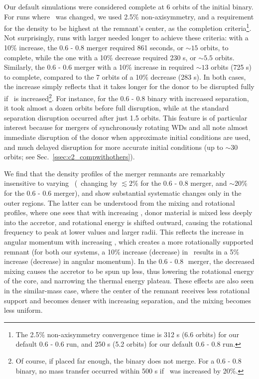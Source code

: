 Our default simulations were considered complete at 6 orbits of the initial binary.  For runs where \azero\ was changed, we used 2.5\% non-axisymmetry, and a requirement for the density to be highest at the remnant's center, as the completion criteria\footnote{The 2.5\% non-axisymmetry convergence time is 312 s (6.6 orbits) for our default 0.6 - 0.6 {\Msun} run, and 250 s (5.2 orbits) for our default 0.6 - 0.8 {\Msun} run.}.  Not surprisingly, runs with larger {\azero} needed longer to achieve these criteria: with a 10\% increase, the 0.6 - 0.8 {\Msun} merger required 861 seconds, or $\sim\!15$ orbits, to complete, while the one with a 10\% decrease required 230 s, or $\sim\!5.5$ orbits.  Similarly, the 0.6 - 0.6 {\Msun} merger with a 10\% increase in {\azero} required $\sim\!13$ orbits (725 s) to complete, compared to the 7 orbits of a 10\% decrease (283 s).  In both cases, the increase simply reflects that it takes longer for the donor to be disrupted fully if \azero\ is increased\footnote{Of course, if placed far enough, the binary does not merge.  For a 0.6 - 0.8 {\Msun} binary, no mass transfer occurred within 500 s if \azero\ was increased by 20\%.}.  For instance, for the 0.6 - 0.8 {\Msun} binary with increased separation, it took almost a dozen orbits before full disruption, while at the standard separation disruption occurred after just 1.5 orbits.  This feature is of particular interest because for mergers of synchronously rotating WDs \cite{dan+11,dan+12} and \cite{rask+12} all note almost immediate disruption of the donor when approximate initial conditions are used, and much delayed disruption for more accurate initial conditions (up to $\sim\!30$ orbits; see Sec.~\ref{ssec:c2_compwithothers}).

We find that the density profiles of the merger remnants are remarkably insensitive to varying \azero\ (\rhoc\ changing by $\lesssim2$\% for the 0.6 - 0.8 {\Msun} merger, and $\sim20$\% for the 0.6 - 0.6 {\Msun} merger), and show substantial systematic changes only in the outer regions.  The latter can be understood from the mixing and rotational profiles, where one sees that with increasing \azero, donor material is mixed less deeply into the accretor, and rotational energy is shifted outward, causing the rotational frequency to peak at lower values and larger radii.  This reflects the increase in angular momentum with increasing \azero, which creates a more rotationally supported remnant (for both our systems, a 10\% increase (decrease) in \azero\ results in a 5\% increase (decrease) in angular momentum).  In the 0.6 - 0.8\,\Msun\ merger, the decreased mixing causes the accretor to be spun up less, thus lowering the rotational energy of the core, and narrowing the thermal energy plateau.  These effects are also seen in the similar-mass case, where the center of the remnant receives less rotational support and becomes denser with increasing separation, and the mixing becomes less uniform.

